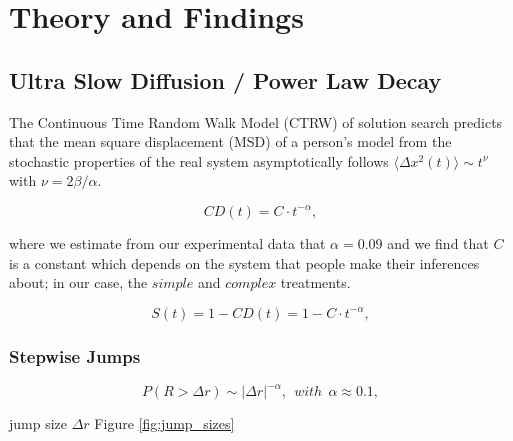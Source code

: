 %
%
%
%
%
%
%
%
%


\section{Theory and Findings}

\subsection{Ultra Slow Diffusion / Power Law Decay}

The Continuous Time Random Walk Model (CTRW) of solution search predicts that the mean square displacement (MSD) of a person's model from the stochastic properties of the real system asymptotically follows $\langle \Delta x^2 (t) \rangle \sim t^{\nu}$ with $\nu = 2\beta /\alpha$. 

\begin{equation}
\label{power_law_decay}
CD(t) = C \cdot t^{-\alpha},
\end{equation}

where we estimate from our experimental data that $\alpha = 0.09$ and we find that $C$ is a constant which depends on the system that people make their inferences about; in our case, the $simple$ and $complex$ treatments. 

\begin{equation}
\label{ultraslowdiffusion}
S(t) = 1 - CD(t) = 1- C \cdot t^{-\alpha},
\end{equation}


\subsubsection{Stepwise Jumps}

\begin{equation}
P(R > \Delta r) \sim |\Delta r|^{-\alpha}, ~~with~~\alpha \approx 0.1,
\end{equation}

jump size $\Delta r$ Figure \ref{fig:jump_sizes}

